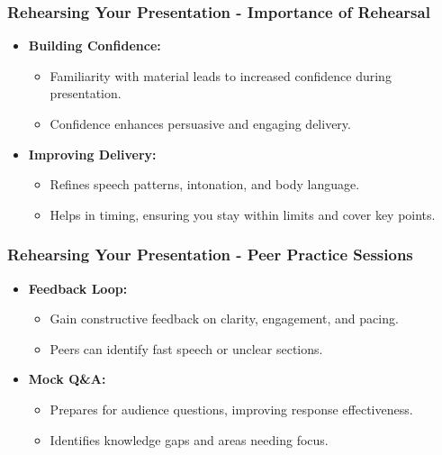 \documentclass{beamer}
\begin{document}
\begin{frame}[fragile]
    \frametitle{Rehearsing Your Presentation - Importance of Rehearsal}
    \begin{itemize}
        \item \textbf{Building Confidence:}
        \begin{itemize}
            \item Familiarity with material leads to increased confidence during presentation.
            \item Confidence enhances persuasive and engaging delivery.
        \end{itemize}

        \item \textbf{Improving Delivery:}
        \begin{itemize}
            \item Refines speech patterns, intonation, and body language.
            \item Helps in timing, ensuring you stay within limits and cover key points.
        \end{itemize}
    \end{itemize}
\end{frame}

\begin{frame}[fragile]
    \frametitle{Rehearsing Your Presentation - Peer Practice Sessions}
    \begin{itemize}
        \item \textbf{Feedback Loop:}
        \begin{itemize}
            \item Gain constructive feedback on clarity, engagement, and pacing.
            \item Peers can identify fast speech or unclear sections.
        \end{itemize}

        \item \textbf{Mock Q\&A:}
        \begin{itemize}
            \item Prepares for audience questions, improving response effectiveness.
            \item Identifies knowledge gaps and areas needing focus.
        \end{itemize}
    \end{itemize}
\end{frame}
\end{document}
